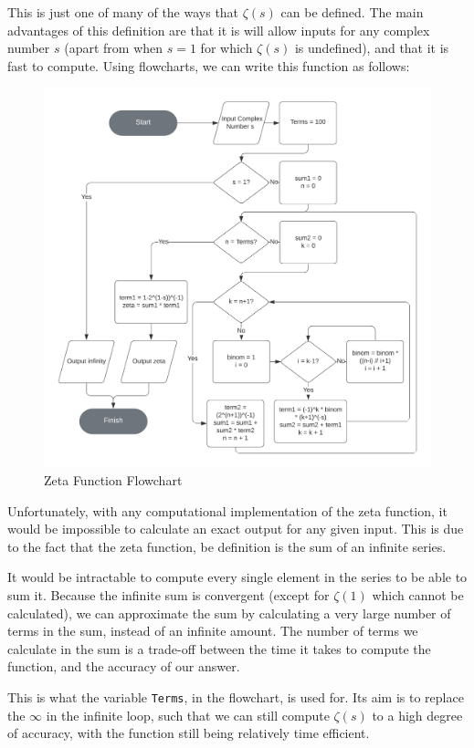 \documentclass{article}
\begin{document}
This is just one of many of the ways that $\zeta(s)$ can be defined. The main advantages of this definition are that it is will allow inputs for any complex number $s$ (apart from when $s = 1$ for which $\zeta(s)$ is undefined), and that it is fast to compute.
\clearpage
Using flowcharts, we can write this function as follows:
\begin{figure}[h]
    \centering
    \caption{Zeta Function Flowchart}
    \captionsetup{justification=centering}
    \includegraphics[scale=0.6]{zeta-function-flowchart-two}
\end{figure}

Unfortunately, with any computational implementation of the zeta function, it would be impossible to calculate an exact output for any given input. This is due to the fact that the zeta function, be definition is the sum of an infinite series.

It would be intractable to compute every single element in the series to be able to sum it. Because the infinite sum is convergent (except for $\zeta(1)$ which cannot be calculated), we can approximate the sum by calculating a very large number of terms in the sum, instead of an infinite amount. The number of terms we calculate in the sum is a trade-off between the time it takes to compute the function, and the accuracy of our answer.

This is what the variable \texttt{Terms}, in the flowchart, is used for. Its aim is to replace the $\infty$ in the infinite loop, such that we can still compute $\zeta(s)$ to a high degree of accuracy, with the function still being relatively time efficient.
\end{document}
